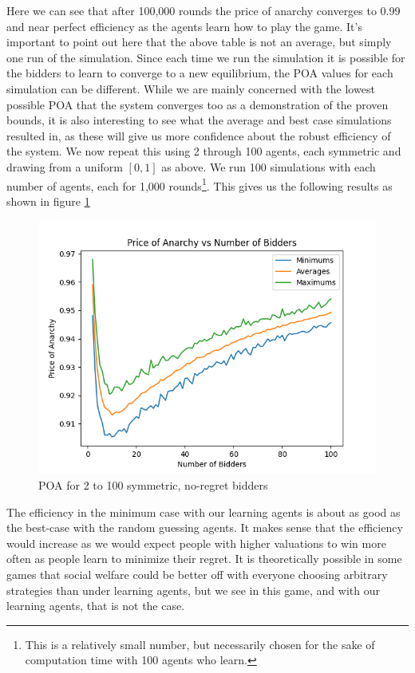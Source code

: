 \documentclass[12pt,twoside]{reedthesis}
\begin{document}
Here we can see that after 100,000 rounds the price of anarchy converges to 0.99 and near perfect efficiency as the agents learn how to play the game. It's important to point out here that the above table is not an average, but simply one run of the simulation. Since each time we run the simulation it is possible for the bidders to learn to converge to a new equilibrium, the POA values for each simulation can be different. While we are mainly concerned with the lowest possible POA that the system converges too as a demonstration of the proven bounds, it is also interesting to see what the average and best case simulations resulted in, as these will give us more confidence about the robust efficiency of the system. We now repeat this using 2 through 100 agents, each symmetric and drawing from a uniform $[0,1]$ as above. We run 100 simulations with each number of agents, each for 1,000 rounds\footnote{This is a relatively small number, but necessarily chosen for the sake of computation time with 100 agents who learn.}. This gives us the following results as shown in figure \ref{figure:symmetric} 

\begin{figure}[h!]
	\centering
	\includegraphics[scale=.8]{Figures/symmetric}
	\caption{POA for 2 to 100 symmetric, no-regret bidders}
	\label{figure:symmetric}
\end{figure}

The efficiency in the minimum case with our learning agents is about as good as the best-case with the random guessing agents. It makes sense that the efficiency would increase as we would expect people with higher valuations to win more often as people learn to minimize their regret. It is theoretically possible in some games that social welfare could be better off with everyone choosing arbitrary strategies than under learning agents, but we see in this game, and with our learning agents, that is not the case.  
\end{document}
